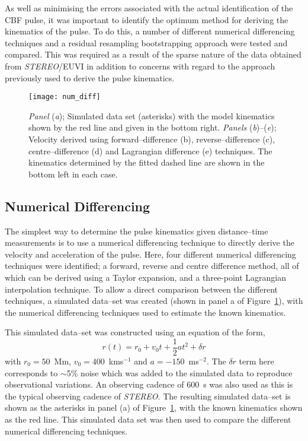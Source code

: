 As well as minimising the errors associated with the actual identification of the CBF pulse, it was important to identify the optimum method for deriving the kinematics of the pulse. To do this, a number of different numerical differencing techniques and a residual resampling bootstrapping approach were tested and compared. This was required as a result of the sparse nature of the data obtained from \emph{STEREO}/EUVI in addition to concerns with regard to the approach previously used to derive the pulse kinematics.

\begin{figure}[!hp]
\begin{center}
\texttt{[image: num\_diff]}
\caption{\emph{Panel} (\emph{a}); Simulated data set (asterisks) with the model kinematics shown by the red line and given in the bottom right. \emph{Panels} (\emph{b})--(\emph{e}); Velocity derived using forward--difference (b), reverse--difference (c), centre--difference (d) and Lagrangian difference (e) techniques. The kinematics determined by the fitted dashed line are shown in the bottom left in each case.}
\label{fig:num_diff}
\end{center}
\end{figure}

\subsection{Numerical Differencing}
\label{subsect:num_diff}

The simplest way to determine the pulse kinematics given distance--time measurements is to use a numerical differencing technique to directly derive the velocity and acceleration of the pulse. Here, four different numerical differencing techniques were identified; a forward, reverse and centre difference method, all of which can be derived using a Taylor expansion, and a three-point Lagrangian interpolation technique. To allow a direct comparison between the different techniques, a simulated data--set was created (shown in panel a of Figure~\ref{fig:num_diff}), with the numerical differencing techniques used to estimate the known kinematics.

This simulated data--set was constructed using an equation of the form,
\begin{equation}
r(t) = r_0 + v_0 t + \frac{1}{2}a t^2 + \delta r
\end{equation}
with $r_0 = 50$~Mm, $v_0 = 400$~kms$^{-1}$ and $a = -150$~ms$^{-2}$. The $\delta r$ term here corresponds to $\sim$5\% noise which was added to the simulated data to reproduce observational variations. An observing cadence of 600~s was also used as this is the typical observing cadence of \emph{STEREO}. The resulting simulated data--set is shown as the asterisks in panel (a) of Figure~\ref{fig:num_diff}, with the known kinematics shown as the red line. This simulated data set was then used to compare the different numerical differencing techniques.


